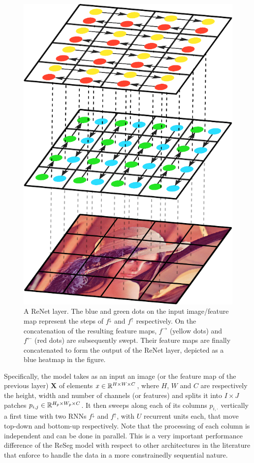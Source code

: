 \begin{figure}[t]
    \begin{center}
        \includegraphics[width=0.3\columnwidth]{img/reseg/first_layer.pdf}
        \caption{A ReNet layer. The blue and green dots on the input
            image/feature map represent the steps of $f^{\downarrow}$ and
            $f^{\uparrow}$ respectively. On the concatenation of the resulting
            feature maps, $f^{\rightarrow}$ (yellow dots) and $f^{\leftarrow}$
            (red dots) are subsequently swept. Their feature maps are finally
            concatenated to form the output of the ReNet layer, depicted as a
            blue heatmap in the figure.}
        \label{fig:first_layer}
        \vspace{-5mm}
    \end{center}
\end{figure}


Specifically, the model takes as an input an image (or the feature map of the
previous layer) $\mathbf{X}$ of elements $x \in \mathbb{R}^{H \times W \times C}$,
where $H$, $W$ and $C$ are respectively the height, width and number of
channels (or features) and splits it into $I \times J$ patches $p_{i,j} \in
\mathbb{R}^{H_p \times W_p \times C}$. It then sweeps along each of its columns
$p_{i,\cdot}$ vertically a first time with two RNNs $f^{\downarrow}$ and
$f^{\uparrow}$, with $U$ recurrent units each, that move top-down and bottom-up
respectively. Note that the processing of each column is independent and can be
done in parallel. This is a very important performance difference of the ReSeg
model with respect to other architectures in the literature that enforce to
handle the data in a more constrainedly sequential nature.

